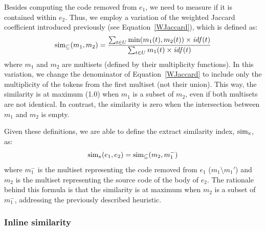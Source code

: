 Besides computing the code removed from $e_1$, we need to measure if it is contained within $e_2$. Thus, we employ a variation of the weighted Jaccard coefficient introduced previously (see Equation~\ref{WJaccard}), which is defined as:
\begin{align}
\operatorname{sim_{\subseteq}}(m_1, m_2) = \frac{\sum_{t \in U} \min(m_1(t), m_2(t)) \times \mathit{idf}(t)}
                        {\sum_{t \in U} m_1(t) \times \mathit{idf}(t)}
\end{align}
where $m_1$ and $m_2$ are multisets (defined by their multiplicity functions).
In this variation, we change the denominator of Equation~\ref{WJaccard} to include only the multiplicity of the tokens from the first multiset (not their union).
This way, the similarity is at maximum (1.0) when $m_1$ is a subset of $m_2$, even if both multisets are not identical. In contrast, the similarity is zero when the intersection between $m_1$ and $m_2$ is empty.


Given these definitions, we are able to define the extract similarity index, $\operatorname{sim_{x}}$, as:
\begin{align}
\operatorname{sim_{x}}(e_1, e_2) = \operatorname{sim_{\subseteq}}(m_2, m_1^-)
\end{align}
where $m_1^-$ is the multiset representing the code removed from $e_1$ ($m_1 \setminus m_1'$) and $m_2$ is the multiset representing the source code of the body of $e_2$.
The rationale behind this formula is that the similarity is at maximum
when $m_2$ is a subset of $m_1^-$, addressing the previously described heuristic.





\subsubsection{Inline similarity}
\label{SecSimI}

